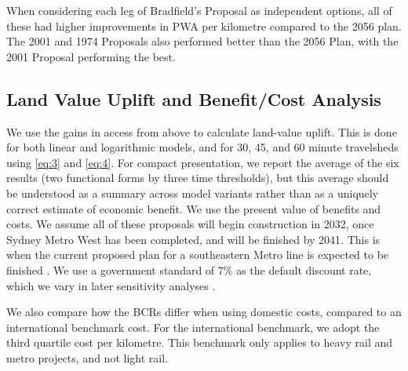 \documentclass[preprint,12pt,authoryear]{elsarticle}
\begin{document}
When considering each leg of Bradfield's Proposal as independent options, all of these had higher improvements in PWA per kilometre compared to the 2056 plan. The 2001 and 1974 Proposals also performed better than the 2056 Plan, with the 2001 Proposal performing the best. 



\subsection{Land Value Uplift and Benefit/Cost Analysis}
{We use the gains in access from above to calculate land-value uplift. This is done for both linear and logarithmic models, and for 30, 45, and 60 minute travelsheds using \ref{eq:3} and \ref{eq:4}. For compact presentation, we report the average of the six results (two functional forms by three time thresholds), but this average should be understood as a summary across model variants rather than as a uniquely correct estimate of economic benefit. We use the present value of benefits and costs. We assume all of these proposals will begin construction in 2032, once Sydney Metro West has been completed, and will be finished by 2041. This is when the current proposed plan for a southeastern Metro line is expected to be finished \parencite{SouthEastSydneyTransportStrategy}. We use a government standard of 7\% as the default discount rate, which we vary in later sensitivity analyses \parencite{atap2024}.}

We also compare how the BCRs differ when using domestic costs, compared to an international benchmark cost. For the international benchmark, we adopt the third quartile cost per kilometre. This benchmark only applies to heavy rail and metro projects, and not light rail.
\end{document}
